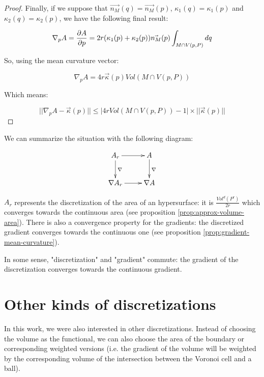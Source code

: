 \begin{proof}
Finally, if we suppose that $ \vec{n_M}(q) = \vec{n_M}(p) $, $ \kappa_1(q) =
\kappa_1(p) $ and $ \kappa_2(q) = \kappa_2(p) $, we have the following final
result:

$$ \nabla_p A = \frac{\partial{A}}{\partial{p}} = 2r (\kappa_1(p) + \kappa_2(p)) \vec{n_M}(p) \int_{M \cap V(p, P)} dq $$

So, using the mean curvature vector:

$$ \nabla_p A = 4r \vec{\kappa}(p) Vol(M \cap V(p, P)) $$

Which means:

$$ ||\nabla_p A - \vec{\kappa}(p) || \leq | 4r Vol(M \cap V(p, P)) - 1 |
\times|| \vec{\kappa}(p) ||$$

\end{proof}

We can summarize the situation with the following diagram:

\begin{displaymath}
    \xymatrix{A_r \ar[d]^{\nabla} \ar[r] & A \ar[d]^{\nabla} \\
        \nabla A_r \ar[r] & \nabla A }
\end{displaymath}

$ A_r $ represents the discretization of the area of an hypersurface: it
is $ \frac{Vol^d(P^r)}{2r} $ which converges towards the continuous area (see
proposition \ref{prop:approx-volume-area}). There is also a convergence property
for the gradients: the discretized gradient converges towards the continuous one
(see proposition \ref{prop:gradient-mean-curvature}).

In some sense, "discretization" and "gradient" commute: the gradient of the
discretization converges towards the continuous gradient.


\section{Other kinds of discretizations}

In this work, we were also interested in other discretizations. Instead of
choosing the volume as the functional, we can also choose the area of the
boundary or corresponding weighted versions (i.e. the gradient of the volume
will be weighted by the corresponding volume of the intersection between the
Voronoi cell and a ball).

